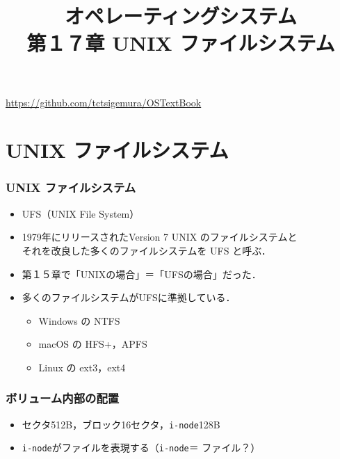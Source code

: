 \documentclass{beamer}                   %
\newcommand{\inode}{\texttt{i-node}}
\begin{document}
\title[UNIX ファイルシステム]
      {オペレーティングシステム\\第１７章 UNIX ファイルシステム}
\date{}
\begin{frame}
  \titlepage
  \centerline{\url{https://github.com/tctsigemura/OSTextBook}}
\end{frame}


\section{UNIX ファイルシステム}
\begin{frame}
  \frametitle{UNIX ファイルシステム}
  \begin{itemize}
  \item UFS（UNIX File System）
  \item 1979年にリリースされたVersion 7 UNIX のファイルシステムと \\
    それを改良した多くのファイルシステムを UFS と呼ぶ．
  \item 第１５章で「UNIXの場合」＝「UFSの場合」だった．
  \item 多くのファイルシステムがUFSに準拠している．
    \begin{itemize}
    \item Windows の NTFS
    \item macOS の HFS+，APFS
    \item Linux の ext3，ext4
    \end{itemize}
  \end{itemize}
  \vfill
\end{frame}

\begin{frame}
  \frametitle{ボリューム内部の配置}
  \begin{itemize}
  \item セクタ512B，ブロック16セクタ，\inode 128B
  \item \inode がファイルを表現する（\inode ＝ ファイル？）
  \end{itemize}
  \vfill
\end{frame}
\end{document}
